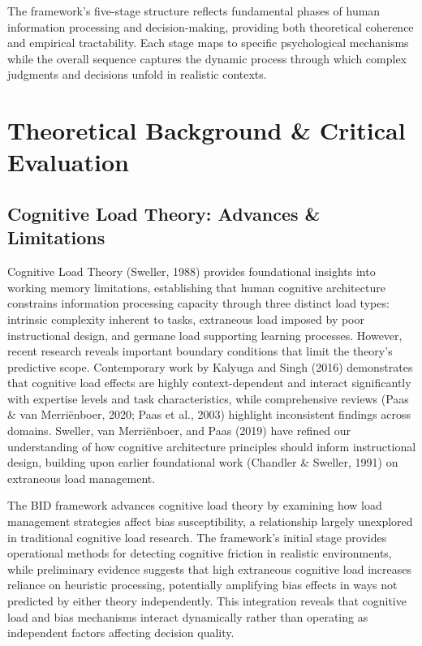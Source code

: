\documentclass[
  authoryear,
  preprint]{elsarticle}
\begin{document}
The framework's five-stage structure reflects fundamental phases of
human information processing and decision-making, providing both
theoretical coherence and empirical tractability. Each stage maps to
specific psychological mechanisms while the overall sequence captures
the dynamic process through which complex judgments and decisions unfold
in realistic contexts.

\section{Theoretical Background \& Critical
Evaluation}\label{theoretical-background-critical-evaluation}

\subsection{Cognitive Load Theory: Advances \&
Limitations}\label{cognitive-load-theory-advances-limitations}

Cognitive Load Theory (Sweller, 1988) provides foundational insights
into working memory limitations, establishing that human cognitive
architecture constrains information processing capacity through three
distinct load types: intrinsic complexity inherent to tasks, extraneous
load imposed by poor instructional design, and germane load supporting
learning processes. However, recent research reveals important boundary
conditions that limit the theory's predictive scope. Contemporary work
by Kalyuga and Singh (2016) demonstrates that cognitive load effects are
highly context-dependent and interact significantly with expertise
levels and task characteristics, while comprehensive reviews (Paas \&
van Merriënboer, 2020; Paas et al., 2003) highlight inconsistent
findings across domains. Sweller, van Merriënboer, and Paas (2019) have
refined our understanding of how cognitive architecture principles
should inform instructional design, building upon earlier foundational
work (Chandler \& Sweller, 1991) on extraneous load management.

The BID framework advances cognitive load theory by examining how load
management strategies affect bias susceptibility, a relationship largely
unexplored in traditional cognitive load research. The framework's
initial stage provides operational methods for detecting cognitive
friction in realistic environments, while preliminary evidence suggests
that high extraneous cognitive load increases reliance on heuristic
processing, potentially amplifying bias effects in ways not predicted by
either theory independently. This integration reveals that cognitive
load and bias mechanisms interact dynamically rather than operating as
independent factors affecting decision quality.
\end{document}
